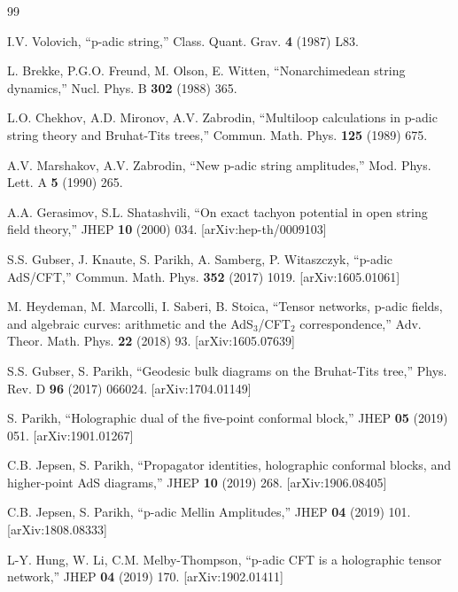 \documentclass[11pt,a4paper]{article}
\begin{document}
\begin{thebibliography}{99}


 I.V. Volovich, ``p-adic string,'' Class. Quant. Grav. \textbf{4} (1987) L83.

 L. Brekke, P.G.O. Freund, M. Olson, E. Witten, ``Nonarchimedean string dynamics,'' Nucl. Phys. B \textbf{302} (1988) 365.

 L.O. Chekhov, A.D. Mironov, A.V. Zabrodin, ``Multiloop calculations in p-adic string theory and Bruhat-Tits trees,'' Commun. Math. Phys. \textbf{125} (1989) 675.

 A.V. Marshakov, A.V. Zabrodin, ``New p-adic string amplitudes,'' Mod. Phys. Lett. A \textbf{5} (1990) 265.

 A.A. Gerasimov, S.L. Shatashvili, ``On exact tachyon potential in open string field theory,'' JHEP \textbf{10} (2000) 034. [arXiv:hep-th/0009103]


 S.S. Gubser, J. Knaute, S. Parikh, A. Samberg, P. Witaszczyk, ``p-adic AdS/CFT,'' Commun. Math. Phys. \textbf{352} (2017) 1019. [arXiv:1605.01061]

 M. Heydeman, M. Marcolli, I. Saberi, B. Stoica, ``Tensor networks, p-adic fields, and algebraic curves: arithmetic and the AdS$_3$/CFT$_2$ correspondence,'' Adv. Theor. Math. Phys. \textbf{22} (2018) 93. [arXiv:1605.07639]

 S.S. Gubser, S. Parikh, ``Geodesic bulk diagrams on the Bruhat-Tits tree,'' Phys. Rev. D \textbf{96} (2017) 066024. [arXiv:1704.01149]

 S. Parikh, ``Holographic dual of the five-point conformal block,'' JHEP \textbf{05} (2019) 051. [arXiv:1901.01267]

 C.B. Jepsen, S. Parikh, ``Propagator identities, holographic conformal blocks, and higher-point AdS diagrams,'' JHEP \textbf{10} (2019) 268. [arXiv:1906.08405]

 C.B. Jepsen, S. Parikh, ``p-adic Mellin Amplitudes,'' JHEP \textbf{04} (2019) 101. [arXiv:1808.08333]

 L-Y. Hung, W. Li, C.M. Melby-Thompson, ``p-adic CFT is a holographic tensor network,'' JHEP \textbf{04} (2019) 170. [arXiv:1902.01411]


\end{thebibliography}
\end{document}
